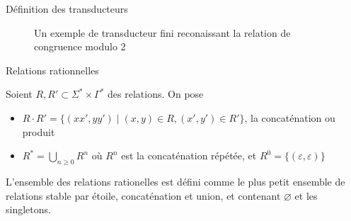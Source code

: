 \documentclass{beamer}
\begin{document}
\begin{frame}{Définition des transducteurs}
    \begin{figure}[h]
    \caption{Un exemple de transducteur fini reconaissant la relation de congruence modulo 2}
    \begin{center}
    \vspace*{0.5cm}
    \end{center}
\end{figure}
\end{frame}

\begin{frame}{Relations rationnelles}
    \begin{definition}
        Soient $R, R' \subset \Sigma^* \times \Gamma^*$ des relations. On pose
        \begin{itemize}
            \item $R \cdot R' = \{ (xx', yy') \mid (x, y) \in R, (x', y') \in R' \}$, la concaténation ou produit
            \item $\displaystyle R^* = \bigcup_{n \geq 0} R^n$ où $R^n$ est la concaténation répétée, et $R^0 =
            \{ (\varepsilon, \varepsilon) \}$
        \end{itemize}
    \end{definition}
    \begin{definition}
        L'ensemble des relations rationelles est défini comme le plus petit ensemble de relations stable par étoile,
        concaténation et union, et contenant $\varnothing$ et les singletons.
    \end{definition}
\end{frame}
\end{document}
